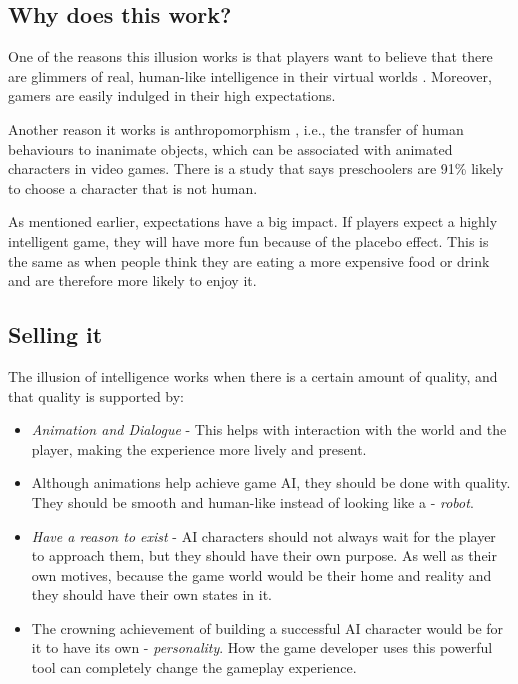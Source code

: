 \documentclass[a4paper,12pt,openright]{book}
\begin{document}
\subsection{Why does this work?}
One of the reasons this illusion works is that players want to believe that there are glimmers of real, human-like intelligence in their virtual worlds \cite{IllusionOfIntelligece}. Moreover, gamers are easily indulged in their high expectations.

Another reason it works is anthropomorphism \cite{AnthropomorphicCharacters}, i.e., the transfer of human behaviours to inanimate objects, which can be associated with animated characters in video games. There is a study \cite{AnthropomorphicCharacters} that says preschoolers are 91\% likely to choose a character that is not human.

As mentioned earlier, expectations have a big impact. If players expect a highly intelligent game, they will have more fun because of the placebo effect. This is the same as when people think they are eating a more expensive food or drink and are therefore more likely to enjoy it.

\subsection{Selling it}
The illusion of intelligence \cite{IllusionOfIntelligece} works when there is a certain amount of quality, and that quality is supported by:
\begin{itemize} \item \emph{Animation and Dialogue} - This helps with interaction with the world and the player, making the experience more lively and present. \item Although animations help achieve game AI, they should be done with quality. They should be smooth and human-like instead of looking like a - \emph{robot}. \item \emph{Have a reason to exist} - AI characters should not always wait for the player to approach them, but they should have their own purpose. As well as their own motives, because the game world would be their home and reality and they should have their own states in it. \item The crowning achievement of building a successful AI character would be for it to have its own - \emph{personality}. How the game developer uses this powerful tool can completely change the gameplay experience.
\end{itemize}
\end{document}
